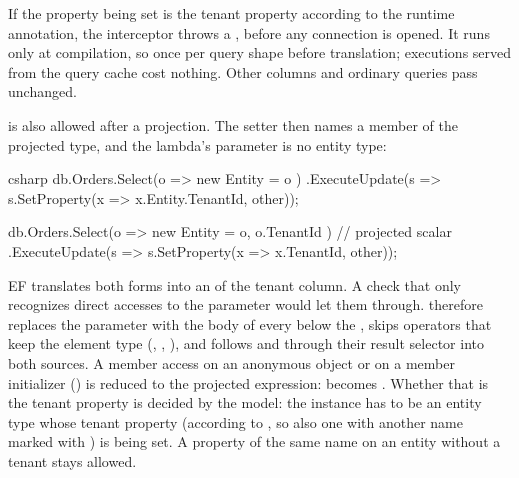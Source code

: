 If the property being set is the tenant property according to the runtime annotation, the
interceptor throws a , before any connection is opened. It runs
only at compilation, so once per query shape before translation; executions served from the
query cache cost nothing.
Other columns and ordinary queries pass unchanged.

 is also allowed after a projection. The setter then names a member
of the projected type, and the lambda's parameter is no entity type:

\begin{sourcecode}{csharp}
db.Orders.Select(o => new { Entity = o })
    .ExecuteUpdate(s => s.SetProperty(x => x.Entity.TenantId, other));

db.Orders.Select(o => new { Entity = o, o.TenantId })      // projected scalar
    .ExecuteUpdate(s => s.SetProperty(x => x.TenantId, other));
\end{sourcecode}

EF translates both forms into an  of the tenant column. A check that only recognizes
direct accesses to the parameter would let them through.  therefore replaces the
parameter with the body of every  below the , skips
operators that keep the element type (, , ), and
follows  and  through their result selector into both
sources. A member access on an anonymous object or on a member initializer
() is reduced to the projected expression:
 becomes
. Whether that is the tenant property is decided by the
model: the instance has to be an entity type whose tenant property (according to
, so also one with another name
marked with ) is being set. A property
of the same name on an entity without a tenant stays allowed.

